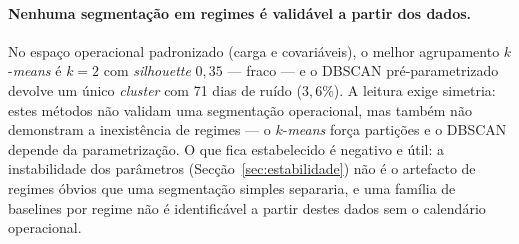 \paragraph{Nenhuma segmentação em regimes é validável a partir dos dados.} No espaço operacional padronizado (carga e covariáveis), o melhor
agrupamento $k$-\emph{means} é $k{=}2$ com \emph{silhouette} $0{,}35$ ---
fraco --- e o DBSCAN pré-parametrizado devolve um único \emph{cluster} com 71
dias de ruído ($3{,}6\%$). A leitura exige simetria: estes métodos não
validam uma segmentação operacional, mas também não demonstram a inexistência
de regimes --- o $k$-\emph{means} força partições e o DBSCAN depende da
parametrização. O que fica estabelecido é negativo e útil: a instabilidade
dos parâmetros (Secção~\ref{sec:estabilidade}) não é o artefacto de
regimes óbvios que uma segmentação simples separaria, e uma família de
baselines por regime não é identificável a partir destes dados sem o
calendário operacional.

